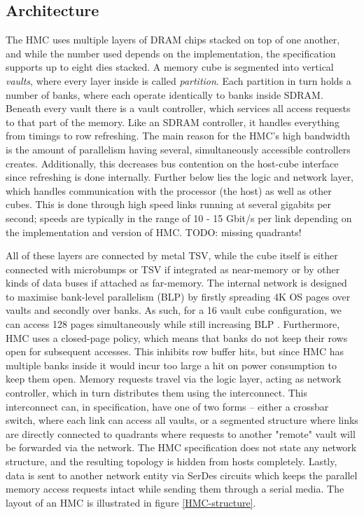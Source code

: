 \subsection{Architecture}
The HMC uses multiple layers of DRAM chips stacked on top of one another, and while the number used depends on the implementation, the specification supports up to eight dies stacked. A memory cube is segmented into vertical \emph{vaults}, where every layer inside is called \emph{partition}. Each partition in turn holds a number of banks, where each operate identically to banks inside SDRAM. Beneath every vault there is a vault controller, which services all access requests to that part of the memory. Like an SDRAM controller, it handles everything from timings to row refreshing. The main reason for the HMC's high bandwidth is the amount of parallelism having several, simultaneously accessible controllers creates. Additionally, this decreases bus contention on the host-cube interface since refreshing is done internally. Further below lies the logic and network layer, which handles communication with the processor (the host) as well as other cubes. This is done through high speed links running at several gigabits per second; speeds are typically in the range of 10 - 15 Gbit/s per link depending on the implementation and version of HMC. TODO: missing quadrants!
\bigskip

All of these layers are connected by metal TSV, while the cube itself is either connected with microbumps or TSV if integrated as near-memory or by other kinds of data buses if attached as far-memory. The internal network is designed to maximise bank-level parallelism (BLP) by firstly spreading 4K OS pages over vaults and secondly over banks. As such, for a 16 vault cube configuration, we can access 128 pages simultaneously while still increasing BLP \cite{8167757}. Furthermore, HMC uses a closed-page policy, which means that banks do not keep their rows open for subsequent accesses. This inhibits row buffer hits, but since HMC has multiple banks inside it would incur too large a hit on power consumption to keep them open. Memory requests travel via the logic layer, acting as network controller, which in turn distributes them using the interconnect. This interconnect can, in specification, have one of two forms -- either a crossbar switch, where each link can access all vaults, or a segmented structure where links are directly connected to quadrants where requests to another "remote" vault will be forwarded via the network. The HMC specification does not state any network structure, and the resulting topology is hidden from hosts completely. Lastly, data is sent to another network entity via SerDes circuits which keeps the parallel memory access requests intact while sending them through a serial media. The layout of an HMC is illustrated in figure \ref{HMC-structure}. 
\bigskip

